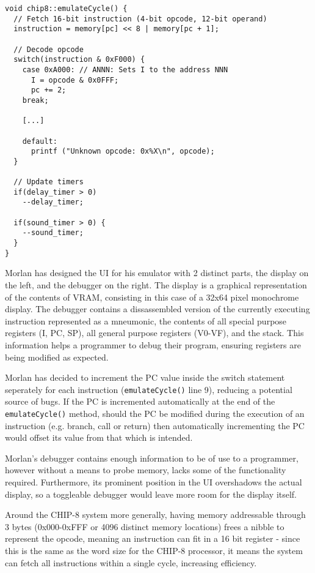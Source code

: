 \begin{lstlisting}
void chip8::emulateCycle() {
  // Fetch 16-bit instruction (4-bit opcode, 12-bit operand)
  instruction = memory[pc] << 8 | memory[pc + 1];
 
  // Decode opcode
  switch(instruction & 0xF000) {    
    case 0xA000: // ANNN: Sets I to the address NNN
      I = opcode & 0x0FFF;
      pc += 2;
    break;

    [...]
 
    default:
      printf ("Unknown opcode: 0x%X\n", opcode);
  }  
 
  // Update timers
  if(delay_timer > 0)
    --delay_timer;
 
  if(sound_timer > 0) {
    --sound_timer;
  }  
}
\end{lstlisting}

Morlan has designed the UI for his emulator with 2 distinct parts, the display on the left, and the debugger on the right. The display is a graphical representation of the contents of VRAM, consisting in this case of a 32x64 pixel monochrome display. The debugger contains a dissassembled version of the currently executing instruction represented as a mneumonic, the contents of all special purpose registers (I, PC, SP), all general purpose registers (V0-VF), and the stack. This information helps a programmer to debug their program, ensuring registers are being modified as expected.

\bigskip


Morlan has decided to increment the PC value inside the switch statement seperately for each instruction (\texttt{emulateCycle()} line 9), reducing a potential source of bugs. If the PC is incremented automatically at the end of the \texttt{emulateCycle()} method, should the PC be modified during the execution of an instruction (e.g. branch, call or return) then automatically incrementing the PC would offset its value from that which is intended. 

Morlan's debugger contains enough information to be of use to a programmer, however without a means to probe memory, lacks some of the functionality required. Furthermore, its prominent position in the UI overshadows the actual display, so a toggleable debugger would leave more room for the display itself.

Around the CHIP-8 system more generally, having memory addressable through 3 bytes (0x000-0xFFF or 4096 distinct memory locations) frees a nibble to represent the opcode, meaning an instruction can fit in a 16 bit register - since this is the same as the word size for the CHIP-8 processor, it means the system can fetch all instructions within a single cycle, increasing efficiency.

